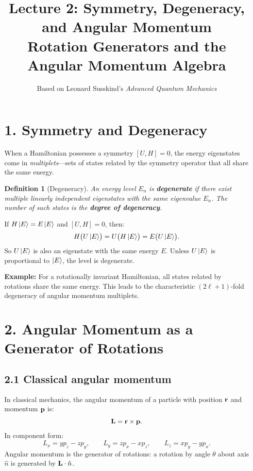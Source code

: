 \documentclass[12pt,a4paper]{article}
\title{\textbf{Lecture 2: Symmetry, Degeneracy, and Angular Momentum} \\ \large Rotation Generators and the Angular Momentum Algebra}
\author{Based on Leonard Susskind's \textit{Advanced Quantum Mechanics}}
\date{}
\newtheorem{definition}{Definition}
\begin{document}
\maketitle
\thispagestyle{fancy}

\section{1. Symmetry and Degeneracy}

When a Hamiltonian possesses a symmetry $[U, H] = 0$, the energy eigenstates come in \emph{multiplets}---sets of states related by the symmetry operator that all share the same energy.

\begin{definition}[Degeneracy]
An energy level $E_n$ is \textbf{degenerate} if there exist multiple linearly independent eigenstates with the same eigenvalue $E_n$.  The number of such states is the \textbf{degree of degeneracy}.
\end{definition}

\noindent If $H\ket{E} = E\ket{E}$ and $[U, H] = 0$, then:
\[
    H\bigl(U\ket{E}\bigr) = U\bigl(H\ket{E}\bigr) = E\bigl(U\ket{E}\bigr).
\]
So $U\ket{E}$ is also an eigenstate with the same energy $E$.  Unless $U\ket{E}$ is proportional to $\ket{E}$, the level is degenerate.

\medskip
\noindent\textbf{Example:} For a rotationally invariant Hamiltonian, all states related by rotations share the same energy.  This leads to the characteristic $(2\ell+1)$-fold degeneracy of angular momentum multiplets.

\section{2. Angular Momentum as a Generator of Rotations}

\subsection{2.1 Classical angular momentum}

In classical mechanics, the angular momentum of a particle with position $\vb{r}$ and momentum $\vb{p}$ is:
\[
    \vb{L} = \vb{r} \times \vb{p}.
\]
In component form:
\[
    L_x = yp_z - zp_y, \qquad L_y = zp_x - xp_z, \qquad L_z = xp_y - yp_x.
\]
Angular momentum is the generator of rotations: a rotation by angle $\theta$ about axis $\hat{n}$ is generated by $\vb{L}\cdot\hat{n}$.
\end{document}
